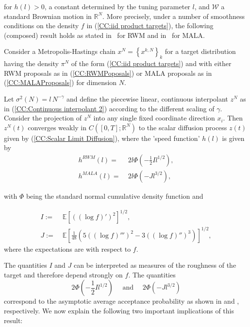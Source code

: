 for $ h(l) > 0 $, a constant determined by the tuning parameter $l$, and $ \mathcal{W} $ a standard Brownian motion in $ \mathbb{R}^{N} $.
More precisely, under a number of smoothness conditions on the density $f$ in (\ref{CC:iid product targets}), the following (composed) result holds as stated in~\autocite{Roberts1997} for RWM and in~\autocite{Roberts1998} for MALA.

\begin{thm}
 \label{CC: Product Diffusion Limit Result}
 
 Consider a Metropolis-Hastings chain $ x^{N} = \left\{  x^{k,N} \right\}_{k} $ for a target distribution having the density $ \pi^{N} $ of the form (\ref{CC:iid product targets}) and with either RWM proposals as in (\ref{CC:RWMPoposals}) or MALA proposals as in (\ref{CC:MALAProposals}) for dimension $N$.
 
 Let $ \sigma^2 (N) = l\,N^{-\gamma}$ and define the piecewise linear, continuous interpolant $z^{N}$  as in (\ref{CC:Continuous interpolant 2}) according to the different scaling of $\gamma$. Consider the projection of $z^{N}$ into any single fixed coordinate direction $x_i$. Then $z^{N}(t)$ converges weakly in $ C \left( [0,T]; \mathbb{R}^{N}\right) $ to the scalar diffusion process $z(t)$ given by (\ref{CC:Scalar Limit Diffusion}), where the 'speed function' $h(l)$ is given by
 \begin{align}
  h^{RWM}(l) = & \; 2l \Phi \left( - \frac{1}{2} I l^{1/2} \right), \\
  h^{MALA}(l) = & \; 2l \Phi \left( - J l^{3/2} \right),
 \end{align}

 with $\Phi$ being the standard normal cumulative density function and
 
 \begin{align}
  I := & \; \mathbb{E} \left[ \left( \left( \log f \right)' \right)^2  \right]^{1/2}, \\
  J := & \; \mathbb{E} \left[ \frac{1}{48} \left( 5 \left( \left( \log f \right)''' \right)^2 - 3 \left( \left( \log f \right)'' \right)^3 \right) \right]^{1/2},
 \end{align}
 where the expectations are with respect to $f$.
 
\end{thm}

The quantities $I$ and $J$ can be interpreted as measures of the roughness of the target and therefore depend strongly on $f$. The quantities 
\begin{equation}
 2 \Phi \left( - \frac{1}{2} I l^{1/2} \right) \quad \text{ and } \quad 2 \Phi \left( - J l^{3/2} \right)
\end{equation}
correspond to the asymptotic average acceptance probability as shown in \autocite{Roberts1997} and \autocite{Roberts1998}, respectively.
We now explain the following two important implications of this result:

